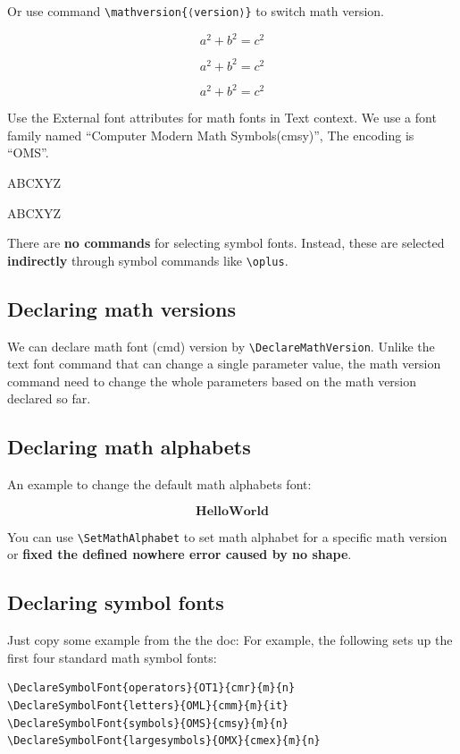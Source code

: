 \documentclass{article}
\begin{document}
Or use command \verb|\mathversion{⟨version⟩}| to switch math version.

\begin{code}
\[ a^2 + b^2 = c^2 \]

\boldmath
\[ a^2 + b^2 = c^2 \]

\unboldmath
\[ a^2 + b^2 = c^2 \]
\end{code}


Use the External font attributes for math fonts in Text context. We use a font family named ``Computer Modern Math Symbols(cmsy)'',
The encoding is ``OMS''.
\begin{code}
\textMathSwitch ABCXYZ

\newtextMathSwitch ABCXYZ
\end{code}

There are \textbf{no commands} for selecting symbol fonts. Instead, these are selected
\textbf{indirectly} through symbol commands like \verb|\oplus|.

\subsection{Declaring math versions}
We can declare math font (cmd) version by \verb|\DeclareMathVersion|. Unlike the text font command that can change 
a single parameter value, the math version command need to change the whole parameters based on the math version declared so far.



\subsection{Declaring math alphabets}
An example to change the default math alphabets font:

\begin{code}
\[ \mathbf{Hello World} \]
\end{code}

You can use \verb|\SetMathAlphabet| to set math alphabet for a specific math version or 
\textbf{fixed the defined nowhere error caused by no shape}.


\subsection{Declaring symbol fonts}
Just copy some example from the the doc: For example, the following sets up the first four standard math symbol fonts:
\begin{verbatim}
\DeclareSymbolFont{operators}{OT1}{cmr}{m}{n}
\DeclareSymbolFont{letters}{OML}{cmm}{m}{it}
\DeclareSymbolFont{symbols}{OMS}{cmsy}{m}{n}
\DeclareSymbolFont{largesymbols}{OMX}{cmex}{m}{n}
\end{verbatim}
\end{document}
